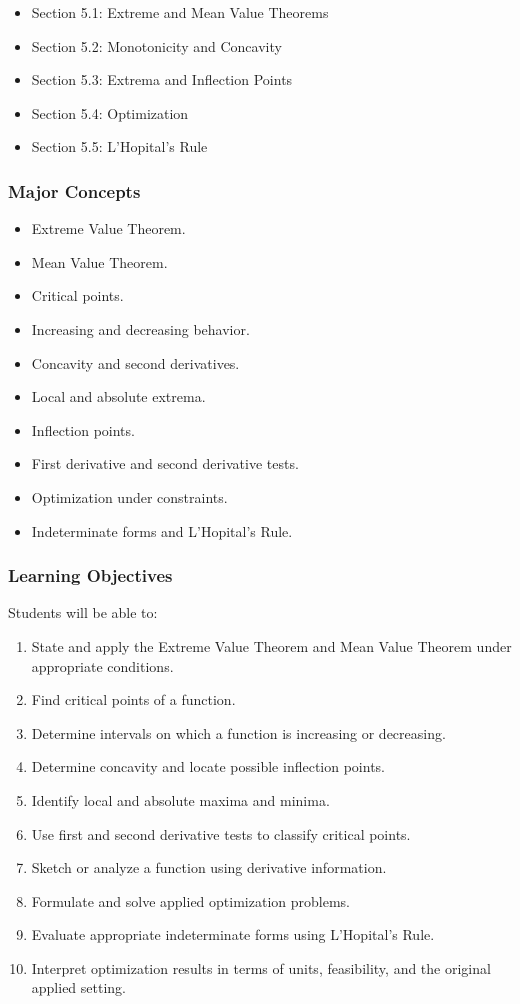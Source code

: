 \documentclass[11pt]{article}
\begin{document}
\begin{itemize}
    \item Section 5.1: Extreme and Mean Value Theorems
    \item Section 5.2: Monotonicity and Concavity
    \item Section 5.3: Extrema and Inflection Points
    \item Section 5.4: Optimization
    \item Section 5.5: L'Hopital's Rule
\end{itemize}

\subsubsection{Major Concepts}

\begin{itemize}
    \item Extreme Value Theorem.
    \item Mean Value Theorem.
    \item Critical points.
    \item Increasing and decreasing behavior.
    \item Concavity and second derivatives.
    \item Local and absolute extrema.
    \item Inflection points.
    \item First derivative and second derivative tests.
    \item Optimization under constraints.
    \item Indeterminate forms and L'Hopital's Rule.
\end{itemize}

\subsubsection{Learning Objectives}

Students will be able to:

\begin{enumerate}
    \item State and apply the Extreme Value Theorem and Mean Value Theorem under appropriate conditions.
    \item Find critical points of a function.
    \item Determine intervals on which a function is increasing or decreasing.
    \item Determine concavity and locate possible inflection points.
    \item Identify local and absolute maxima and minima.
    \item Use first and second derivative tests to classify critical points.
    \item Sketch or analyze a function using derivative information.
    \item Formulate and solve applied optimization problems.
    \item Evaluate appropriate indeterminate forms using L'Hopital's Rule.
    \item Interpret optimization results in terms of units, feasibility, and the original applied setting.
\end{enumerate}
\end{document}
